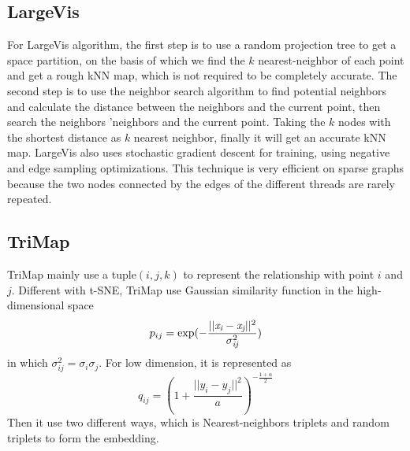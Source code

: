 \documentclass[12pt]{article}
\begin{document}
\subsection*{LargeVis}
For LargeVis algorithm, the first step is to use a random projection tree to get a space partition, on the basis of which we find the $k$ nearest-neighbor of each point and get a rough kNN map, which is not required to be completely accurate. The second step is to use the neighbor search algorithm to find potential neighbors and calculate the distance between the neighbors and the current point, then search the neighbors 'neighbors and the current point. Taking the $k$ nodes with the shortest distance as $k$ nearest neighbor, finally it will get an accurate kNN map.
LargeVis also uses stochastic gradient descent for training, using negative and edge sampling optimizations. This technique is very efficient on sparse graphs because the two nodes connected by the edges of the different threads are rarely repeated. 
\subsection*{TriMap}
TriMap mainly use a tuple$(i, j, k)$ to represent the relationship with point $i$ and $j$. Different with t-SNE, TriMap use Gaussian similarity function in the high-dimensional space\cite{TriMap}
\begin{equation}\label{TriMap}
	p_{ij}=\rm{exp}(-\frac{||\emph{x}_{\emph{i}}-\emph{x}_{\emph{j}}||^2}{\sigma_{\emph{ij}}^{2}})
\end{equation}
in which $\sigma_{ij}^{2} = \sigma_{i}\sigma_{j}$. For low dimension, it is represented as
\begin{equation}
	q_{ij}=(1+\frac{||y_{i}-y_{j}||^2}{a})^{-\frac{1+\alpha}{2}}
\end{equation}
Then it use two different ways, which is Nearest-neighbors triplets and random triplets to form the  embedding.
\end{document}
